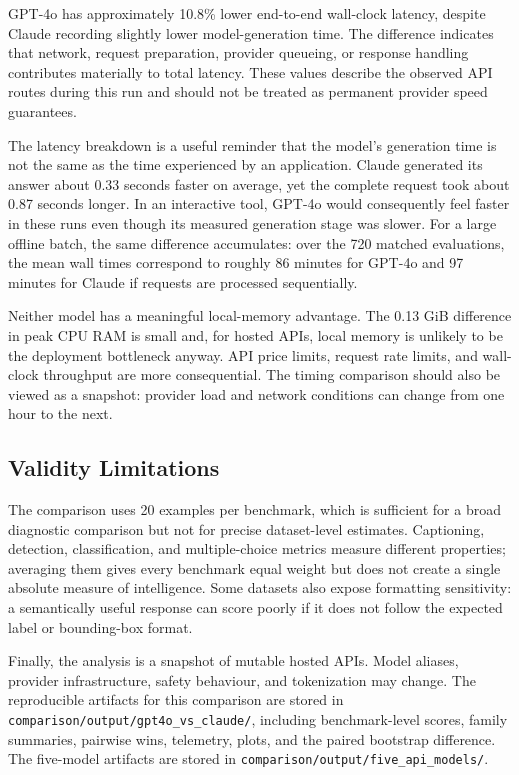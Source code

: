 ﻿\documentclass[11pt,a4paper]{article}
\begin{document}
GPT-4o has approximately 10.8\% lower end-to-end wall-clock latency, despite
Claude recording slightly lower model-generation time. The difference
indicates that network, request preparation, provider queueing, or response
handling contributes materially to total latency. These values describe the
observed API routes during this run and should not be treated as permanent
provider speed guarantees.

The latency breakdown is a useful reminder that the model's generation time
is not the same as the time experienced by an application. Claude generated
its answer about 0.33 seconds faster on average, yet the complete request took
about 0.87 seconds longer. In an interactive tool, GPT-4o would consequently
feel faster in these runs even though its measured generation stage was
slower. For a large offline batch, the same difference accumulates: over the
720 matched evaluations, the mean wall times correspond to roughly 86
minutes for GPT-4o and 97 minutes for Claude if requests are processed
sequentially.

Neither model has a meaningful local-memory advantage. The 0.13 GiB
difference in peak CPU RAM is small and, for hosted APIs, local memory is
unlikely to be the deployment bottleneck anyway. API price limits, request
rate limits, and wall-clock throughput are more consequential. The timing
comparison should also be viewed as a snapshot: provider load and network
conditions can change from one hour to the next.

\subsection{Validity Limitations}

The comparison uses 20 examples per benchmark, which is sufficient for a
broad diagnostic comparison but not for precise dataset-level estimates.
Captioning, detection, classification, and multiple-choice metrics measure
different properties; averaging them gives every benchmark equal weight but
does not create a single absolute measure of intelligence. Some datasets
also expose formatting sensitivity: a semantically useful response can score
poorly if it does not follow the expected label or bounding-box format.

Finally, the analysis is a snapshot of mutable hosted APIs. Model aliases,
provider infrastructure, safety behaviour, and tokenization may change.
The reproducible artifacts for this comparison are stored in
\texttt{comparison/output/gpt4o\_vs\_claude/}, including benchmark-level
scores, family summaries, pairwise wins, telemetry, plots, and the paired
bootstrap difference. The five-model artifacts are stored in
\texttt{comparison/output/five\_api\_models/}.
\end{document}
